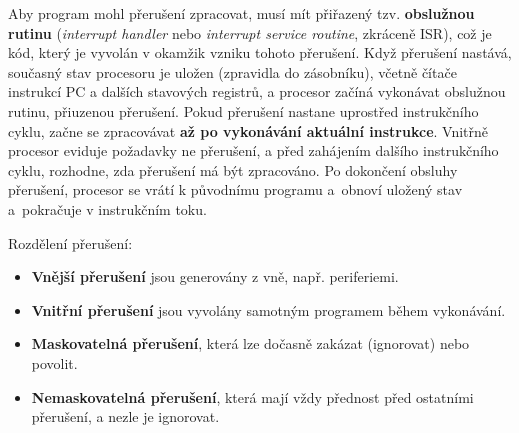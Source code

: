 Aby program mohl přerušení zpracovat, musí mít přiřazený tzv. \textbf{obslužnou rutinu}
(\textit{interrupt handler} nebo \textit{interrupt service routine}, zkráceně ISR), což je kód,
který je vyvolán v okamžik vzniku tohoto přerušení. Když přerušení nastává, současný stav procesoru
je uložen (zpravidla do zásobníku), včetně čítače instrukcí PC a dalších stavových registrů, a
procesor začíná vykonávat obslužnou rutinu, přiuzenou přerušení. Pokud přerušení nastane uprostřed
instrukčního cyklu, začne se zpracovávat \textbf{až po vykonávání aktuální instrukce}. Vnitřně
procesor eviduje požadavky ne přerušení, a před zahájením dalšího instrukčního cyklu, rozhodne, zda
přerušení má být zpracováno. Po dokončení obsluhy přerušení, procesor se vrátí k původnímu programu
a~obnoví uložený stav a~pokračuje v instrukčním toku.

Rozdělení přerušení:

\begin{itemize}
    \item \textbf{Vnější přerušení} jsou generovány z vně, např. periferiemi.
    \item \textbf{Vnitřní přerušení} jsou vyvolány samotným programem během vykonávání.
    \item \textbf{Maskovatelná přerušení}, která lze dočasně zakázat (ignorovat) nebo povolit.
    \item \textbf{Nemaskovatelná přerušení}, která mají vždy přednost před ostatními přerušení,
        a nezle je ignorovat.
\end{itemize}

%
%
